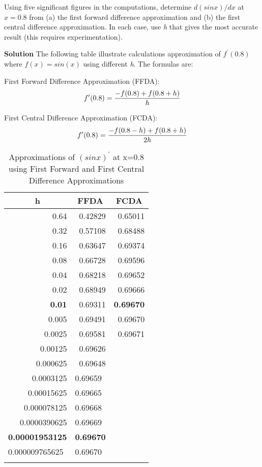 \begin{exercise}{5}
Using five significant figures in the computations, determine \(d(sin x)/dx\) at \(x = 0.8\) from (a) the first forward difference approximation and (b) the first central difference approximation. In each case, use \textit{h} that gives the most accurate result (this requires experimentation).

\textbf{Solution}
The following table illustrate calculations approximation of $f^\prime(0.8)$ where $f(x)=sin(x)$ using different \textit{h}.
The formulas are:

First Forward Difference Approximation (FFDA):
\begin{align}
f^\prime(0.8) = \frac{-f(0.8) + f(0.8+h)}{h} \notag
\end{align}

First Central Difference Approximation (FCDA):
\begin{align}
f^\prime(0.8) = \frac{-f(0.8-h) + f(0.8+h)}{2h} \notag
\end{align}
\begin{longtable}[c]{|r|r|r|}
\hline
\multicolumn{1}{|c|}{\textbf{h}} & \multicolumn{1}{c|}{\textbf{FFDA}} & \multicolumn{1}{c|}{\textbf{FCDA}} \\ \hline
\endfirsthead
%
\endhead
%
0.64 & 0.42829 & 0.65011 \\ \hline
0.32 & 0.57108 & 0.68488 \\ \hline
0.16 & 0.63647 & 0.69374 \\ \hline
0.08 & 0.66728 & 0.69596 \\ \hline
0.04 & 0.68218 & 0.69652 \\ \hline
0.02 & 0.68949 & 0.69666 \\ \hline
\textbf{0.01} & 0.69311 & \textbf{0.69670} \\ \hline
0.005 & 0.69491 & 0.69670 \\ \hline
0.0025 & 0.69581 & 0.69671 \\ \hline
0.00125 & 0.69626 &  \\ \hline
0.000625 & 0.69648 &  \\ \hline
0.0003125 & \multicolumn{1}{l|}{0.69659} & \multicolumn{1}{l|}{} \\ \hline
0.00015625 & \multicolumn{1}{l|}{0.69665} & \multicolumn{1}{l|}{} \\ \hline
0.000078125 & \multicolumn{1}{l|}{0.69668} & \multicolumn{1}{l|}{} \\ \hline
0.0000390625 & \multicolumn{1}{l|}{0.69669} & \multicolumn{1}{l|}{} \\ \hline
\textbf{0.00001953125} & \multicolumn{1}{l|}{\textbf{0.69670}} & \multicolumn{1}{l|}{} \\ \hline
\multicolumn{1}{|l|}{0.000009765625} & \multicolumn{1}{l|}{0.69670} & \multicolumn{1}{l|}{} \\ \hline
\caption{Approximations of $(sinx)^\prime$ at x=0.8 using First Forward and First Central Difference Approximations}


\end{longtable}
\end{exercise}
